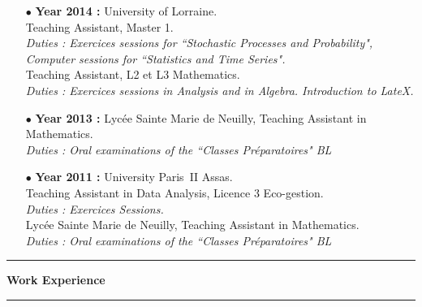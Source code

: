 \documentclass[a4paper,11pt]{article}
\newcommand{\titre}[1]{%
	\begin{center}
	\bigskip
	\rule{\textwidth}{1pt}
	\par\vspace{0.1cm}
        \textbf{\large #1}
	\par\rule{\textwidth}{1pt}
	\end{center}
	\bigskip
	}
\begin{document}
\begin{itemize}
\item[$\bullet$] \textbf{ Year 2014 :}  University of Lorraine.\\
					Teaching Assistant, Master 1. \\
					\textit{Duties : Exercices sessions for ``Stochastic Processes and Probability", Computer sessions for ``Statistics and Time Series".}\\
					Teaching Assistant, L2 et L3 Mathematics. \\
					\textit{Duties : Exercices sessions in Analysis and in Algebra. Introduction to LateX.}\\
\item[$\bullet$] \textbf{ Year 2013 :} Lycée Sainte Marie de Neuilly, Teaching Assistant in Mathematics. \\
					\textit{Duties : Oral examinations of the ``Classes Préparatoires" BL} \\
\item[$\bullet$] \textbf{ Year 2011 :} University Paris~II Assas.\\
					Teaching Assistant in Data Analysis, Licence 3 Eco-gestion.\\
					\textit{Duties : Exercices Sessions.}\\
					Lycée Sainte Marie de Neuilly, Teaching Assistant in Mathematics. \\
					\textit{Duties : Oral examinations of the ``Classes Préparatoires" BL} 
\end{itemize}

\titre{Work Experience}
\end{document}
